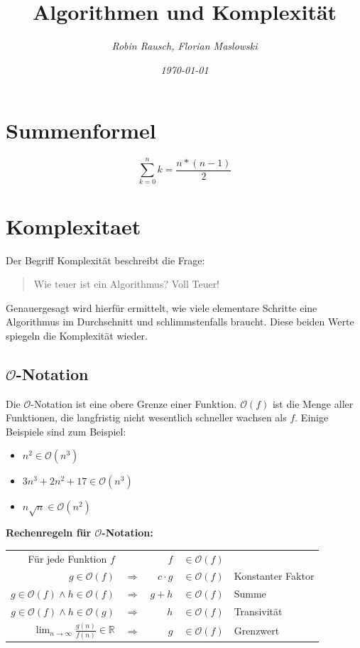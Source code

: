 \documentclass[12pt,a4paper]{article}
\author{\slshape Robin Rausch, Florian Maslowski}
\title{Algorithmen und Komplexität}
\date{\slshape \today}
\begin{document}
\maketitle
\tableofcontents
\newpage
\section{Summenformel}
\begin{equation}
	\sum^n_{k = 0} k = \frac{n * (n-1)}{2}
\end{equation}

\section{Komplexitaet}
Der Begriff Komplexität beschreibt die Frage:
\begin{quote}
	Wie teuer ist ein Algorithmus? Voll Teuer!
\end{quote}
Genauergesagt wird hierfür ermittelt, wie viele elementare Schritte eine Algorithmus im Durchschnitt und schlimmstenfalls braucht. Diese beiden Werte spiegeln die Komplexität wieder.
\subsection{$\mathcal{O}$-Notation}
Die $\mathcal{O}$-Notation ist eine obere Grenze einer Funktion. $\mathcal{O}(f)$ ist die Menge aller Funktionen, die langfristig nicht wesentlich schneller wachsen als $f$.
\newline
Einige Beispiele sind zum Beispiel:\newline
\begin{itemize}
	\item $n^2 \in \mathcal{O}(n^3)$
	\item $3n^3 + 2n^2 + 17 \in \mathcal{O}(n^3)$
	\item $n \sqrt{n} \in \mathcal{O}(n^2)$
\end{itemize}
\textbf{Rechenregeln für $\mathcal{O}$-Notation:}
\begin{center}
	\begin{tabularx}{\textwidth}{r c r c l}
		Für jede Funktion $f$ & & $f$ & $\in \mathcal{O}(f)$ & \\
		$g \in \mathcal{O}(f)$ & $\Rightarrow $ & $c \cdot g$ & $\in \mathcal{O}(f)$ & Konstanter Faktor\\
		$g \in \mathcal{O}(f) \wedge h \in \mathcal{O}(f)$ & $\Rightarrow $ & $g + h$ & $\in \mathcal{O}(f)$ & Summe\\
		$g \in \mathcal{O}(f) \wedge h \in \mathcal{O}(g)$ & $\Rightarrow $ & $h$ & $\in \mathcal{O}(f)$ & Transivität\\
		$\lim_{n \to \infty} \frac{g(n)}{f(n)} \in \mathbb{R} $ & $\Rightarrow $ & $g$ & $\in \mathcal{O}(f)$ & Grenzwert\\
	\end{tabularx}
\end{center}
\end{document}
